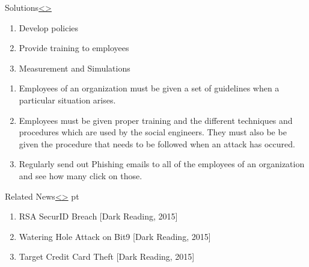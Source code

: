 \documentclass[12pt]{extarticle}
\newenvironment{instructionblock}{\Large\bgroup}{\egroup}
\begin{document}
\pagebreak
\begin{slide}{Solutions}{\hyperref[slide 1]{\textless}\hyperref[slide 3]{\textgreater}}
	\begin{instructionblock}
		\begin{enumerate}
			\item Develop policies 
			\item Provide training to employees
			\item Measurement and Simulations
		\end{enumerate}
	\end{instructionblock}
\end{slide}
\begin{enumerate}
	\item Employees of an organization must be given a set of guidelines when a particular situation arises. 
	\item Employees must be given proper training and the different techniques and procedures which are used by the social engineers. They must also be be given the procedure that needs to be followed when an attack has occured.
	\item Regularly send out Phishing emails to all of the employees of an organization and see how many click on those.
\end{enumerate}
\pagebreak
\begin{slide}{Related News}{\hyperref[slide 2]{\textless}\hyperref[slide 4]{\textgreater}}
	 pt
	\begin{instructionblock}
		\begin{enumerate}
		\item RSA SecurID Breach [Dark Reading, 2015]
		\item Watering Hole Attack on Bit9 [Dark Reading, 2015]
		\item Target Credit Card Theft [Dark Reading, 2015]
		\end{enumerate}
	\end{instructionblock}
\end{slide}
\end{document}
